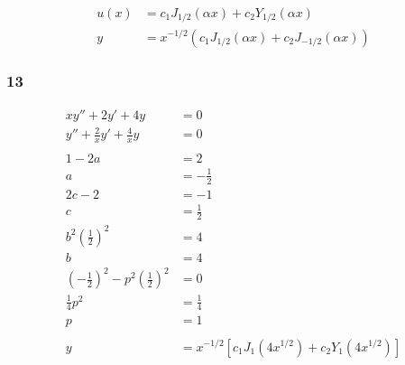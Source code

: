 \documentclass{article}
\begin{document}
\begin{align*}
  u(x) & = c_1 J_{1 / 2}(\alpha x) + c_2 Y_{1 / 2}(\alpha x)               \\
  y    & = x^{-1 / 2} (c_1 J_{1 / 2}(\alpha x) + c_2 J_{-1 / 2}(\alpha x))
\end{align*}

\subsubsection{13}

\begin{align*}
  x y'' + 2 y' + 4 y                                               & = 0                                                        \\
  y'' + \frac{2}{x} y' + \frac{4}{x} y                             & = 0                                                        \\ \\
  1 - 2 a                                                          & = 2                                                        \\
  a                                                                & = -\frac{1}{2}                                             \\
  2 c - 2                                                          & = -1                                                       \\
  c                                                                & = \frac{1}{2}                                              \\
  b^2 \left( \frac{1}{2} \right)^2                                 & = 4                                                        \\
  b                                                                & = 4                                                        \\
  \left( -\frac{1}{2} \right)^2 - p^2 \left( \frac{1}{2} \right)^2 & = 0                                                        \\
  \frac{1}{4} p^2                                                  & = \frac{1}{4}                                              \\
  p                                                                & = 1                                                        \\ \\
  y                                                                & = x^{-1 / 2} [c_1 J_1(4 x^{1 / 2}) + c_2 Y_1(4 x^{1 / 2})]
\end{align*}
\end{document}
